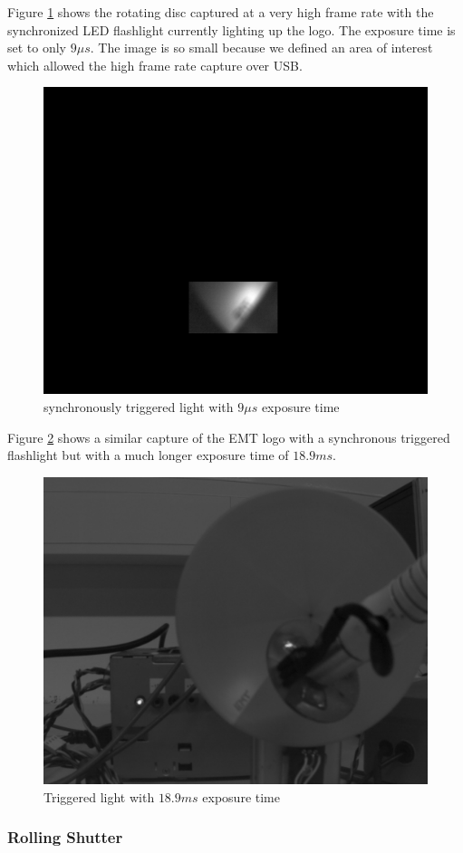 \documentclass[
a4paper,     %
12pt         %
]{scrartcl}  %
\begin{document}
Figure \ref{fig:triggered_9us} shows the rotating disc captured at a very high frame rate with the synchronized LED flashlight currently lighting up the logo.
The exposure time is set to only $9\mu s$.
The image is so small because we defined an area of interest which allowed the high frame rate capture over USB.

\begin{figure}[H]
 \centering
 \includegraphics[width=.6\linewidth]{./Bildg_Messtechnik_Lab/SensorDynamics/triggered_9us.png}
 \caption{synchronously triggered light with $9\mu s$ exposure time}
 \label{fig:triggered_9us}
\end{figure}

Figure \ref{fig:triggered_light_189ms_exp} shows a similar capture of the EMT logo with a synchronous triggered flashlight but with a much longer exposure time of $18.9ms$.

\begin{figure}[H]
 \centering
 \includegraphics[width=.6\linewidth]{./Bildg_Messtechnik_Lab/SensorDynamics/triggered_light_18_9ms_exp.png}
 \caption{Triggered light with $18.9ms$ exposure time}
 \label{fig:triggered_light_189ms_exp}
\end{figure}

\subsubsection{Rolling Shutter}
\end{document}
